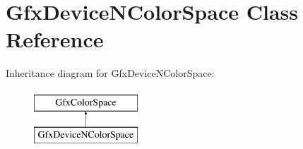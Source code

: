 \hypertarget{class_gfx_device_n_color_space}{}\section{Gfx\+Device\+N\+Color\+Space Class Reference}
\label{class_gfx_device_n_color_space}
Inheritance diagram for Gfx\+Device\+N\+Color\+Space\+:\begin{figure}[H]
\begin{center}
\leavevmode
\includegraphics[height=2.000000cm]{class_gfx_device_n_color_space}
\end{center}
\end{figure}
